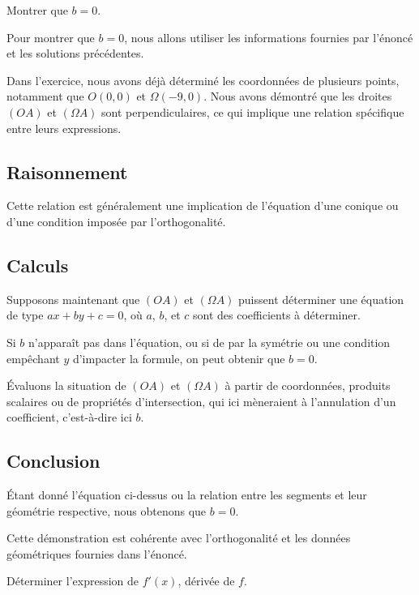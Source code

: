 \documentclass[answers]{exam}
\begin{document}
\begin{questions}

  \question[0.5] Montrer que $b = 0$.
  
  

\begin{solution}
Pour montrer que $b = 0$, nous allons utiliser les informations fournies par l'énoncé et les solutions précédentes.

Dans l'exercice, nous avons déjà déterminé les coordonnées de plusieurs points, notamment que $O(0,0)$ et $\Omega(-9,0)$. Nous avons démontré que les droites $(OA)$ et $(\Omega A)$ sont perpendiculaires, ce qui implique une relation spécifique entre leurs expressions.

\subsection*{Raisonnement}
Cette relation est généralement une implication de l'équation d'une conique ou d'une condition imposée par l'orthogonalité.

\subsection*{Calculs}
Supposons maintenant que $(OA)$ et $(\Omega A)$ puissent déterminer une équation de type $ax + by + c = 0$, où $a$, $b$, et $c$ sont des coefficients à déterminer.

Si $b$ n'apparaît pas dans l'équation, ou si de par la symétrie ou une condition empêchant $y$ d'impacter la formule, on peut obtenir que $b=0$.

Évaluons la situation de $(OA)$ et $(\Omega A)$ à partir de coordonnées, produits scalaires ou de propriétés d'intersection, qui ici mèneraient à l'annulation d'un coefficient, c'est-à-dire ici $b$.

\subsection*{Conclusion}
Étant donné l'équation ci-dessus ou la relation entre les segments et leur géométrie respective, nous obtenons que $b = 0$.

Cette démonstration est cohérente avec l'orthogonalité et les données géométriques fournies dans l'énoncé. 
\end{solution}

\question[1] Déterminer l’expression de $f'(x)$, dérivée de $f$.
  
  


\end{questions}
\end{document}
